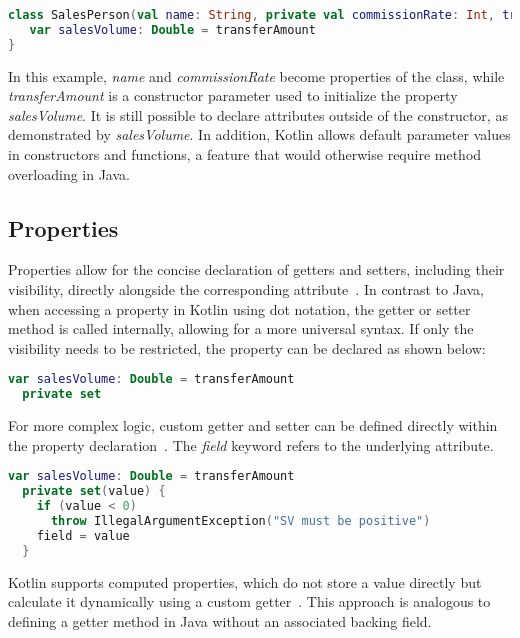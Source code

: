 \documentclass[a4paper, 11pt]{article}
\begin{document}
\begin{lstlisting}[language=Kotlin,title={Kotlin Class Declaration}]
class SalesPerson(val name: String, private val commissionRate: Int, transferAmount: Double = 0.0) {
   var salesVolume: Double = transferAmount
}
\end{lstlisting}

In this example, \textit{name} and \textit{commissionRate} become properties of the class, while \textit{transferAmount} is a constructor parameter used to initialize the property \textit{salesVolume}. It is still possible to declare attributes outside of the constructor, as demonstrated by \textit{salesVolume}. 
In addition, Kotlin allows default parameter values in constructors and functions, a feature that would otherwise require method overloading in Java.

\subsection{Properties}
Properties allow for the concise declaration of getters and setters, including their visibility, directly alongside the corresponding attribute~\cite{declaring-properties,properties-getters-setters}.
In contrast to Java, when accessing a property in Kotlin using dot notation, the getter or setter method is called internally, allowing for a more universal syntax.
If only the visibility needs to be restricted, the property can be declared as shown below:

\begin{lstlisting}[language=Kotlin,title={Private setter}]
var salesVolume: Double = transferAmount
  private set
\end{lstlisting}

For more complex logic, custom getter and setter can be defined directly within the property declaration~\cite{properties-getters-setters}. 
The \textit{field} keyword refers to the underlying attribute. 

\begin{lstlisting}[language=Kotlin,title={Custom accessors}]
var salesVolume: Double = transferAmount
  private set(value) {
    if (value < 0)
      throw IllegalArgumentException("SV must be positive")
    field = value
  }
\end{lstlisting}

Kotlin supports computed properties, which do not store a value directly but calculate it dynamically using a custom getter~\cite{properties-getters-setters}. 
This approach is analogous to defining a getter method in Java without an associated backing field.
\end{document}
